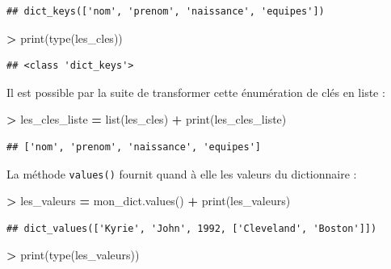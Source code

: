 \documentclass[12pt,]{book}
\newenvironment{Shaded}{\begin{snugshade}}{\end{snugshade}}
\newcommand{\OperatorTok}[1]{\textcolor[rgb]{0.81,0.36,0.00}{\textbf{#1}}}
\newcommand{\BuiltInTok}[1]{#1}
\newcommand{\NormalTok}[1]{#1}
\numberwithin{equation}{section}
\numberwithin{countremarque}{section}
\begin{document}
\begin{lstlisting}
## dict_keys(['nom', 'prenom', 'naissance', 'equipes'])
\end{lstlisting}

\begin{Shaded}
\begin{Highlighting}[]
\OperatorTok{>} \BuiltInTok{print}\NormalTok{(}\BuiltInTok{type}\NormalTok{(les_cles))}
\end{Highlighting}
\end{Shaded}

\begin{lstlisting}
## <class 'dict_keys'>
\end{lstlisting}

Il est possible par la suite de transformer cette énumération de clés en
liste :

\begin{Shaded}
\begin{Highlighting}[]
\OperatorTok{>}\NormalTok{ les_cles_liste }\OperatorTok{=} \BuiltInTok{list}\NormalTok{(les_cles)}
\OperatorTok{+} \BuiltInTok{print}\NormalTok{(les_cles_liste)}
\end{Highlighting}
\end{Shaded}

\begin{lstlisting}
## ['nom', 'prenom', 'naissance', 'equipes']
\end{lstlisting}

La méthode \texttt{values()} fournit quand à elle les valeurs du
dictionnaire :

\begin{Shaded}
\begin{Highlighting}[]
\OperatorTok{>}\NormalTok{ les_valeurs }\OperatorTok{=}\NormalTok{ mon_dict.values()}
\OperatorTok{+} \BuiltInTok{print}\NormalTok{(les_valeurs)}
\end{Highlighting}
\end{Shaded}

\begin{lstlisting}
## dict_values(['Kyrie', 'John', 1992, ['Cleveland', 'Boston']])
\end{lstlisting}

\begin{Shaded}
\begin{Highlighting}[]
\OperatorTok{>} \BuiltInTok{print}\NormalTok{(}\BuiltInTok{type}\NormalTok{(les_valeurs))}
\end{Highlighting}
\end{Shaded}
\end{document}
